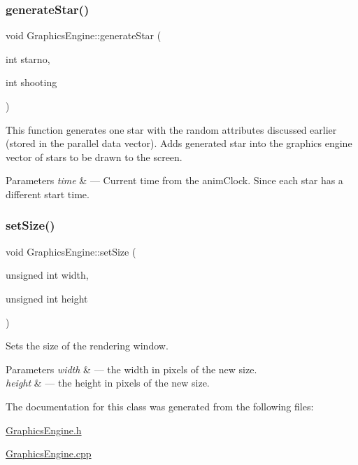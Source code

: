 \subsubsection{\texorpdfstring{generate\+Star()}{generateStar()}}
{\footnotesize\ttfamily void Graphics\+Engine\+::generate\+Star (\begin{DoxyParamCaption}\item[{int}]{starno,  }\item[{int}]{shooting }\end{DoxyParamCaption})}



This function generates one star with the random attributes discussed earlier (stored in the parallel data vector). Adds generated star into the graphics engine vector of stars to be drawn to the screen. 


\begin{DoxyParams}{Parameters}
{\em time} & --- Current time from the anim\+Clock. Since each star has a different start time. \\
\hline
\end{DoxyParams}
\mbox{\label{class_graphics_engine_aac1a9cc3d195ed1f28018dffd80dae41}} 
\subsubsection{\texorpdfstring{set\+Size()}{setSize()}}
{\footnotesize\ttfamily void Graphics\+Engine\+::set\+Size (\begin{DoxyParamCaption}\item[{unsigned int}]{width,  }\item[{unsigned int}]{height }\end{DoxyParamCaption})}



Sets the size of the rendering window. 


\begin{DoxyParams}{Parameters}
{\em width} & --- the width in pixels of the new size.\\
\hline
{\em height} & --- the height in pixels of the new size. \\
\hline
\end{DoxyParams}


The documentation for this class was generated from the following files\+:\begin{DoxyCompactItemize}
\item 
\hyperlink{_graphics_engine_8h}{Graphics\+Engine.\+h}\item 
\hyperlink{_graphics_engine_8cpp}{Graphics\+Engine.\+cpp}\end{DoxyCompactItemize}
